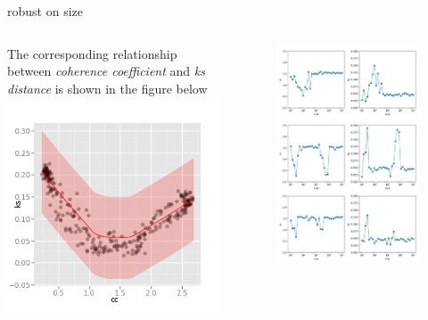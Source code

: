\documentclass{beamer}
\begin{document}
\begin{frame}{robust on size}
	\begin{columns}
		The corresponding relationship between \textit{coherence coefficient} and \textit{ks distance} is shown in the figure below
		\centering
		\includegraphics[width=0.85\linewidth]{fig/cc_vc_ks}
		\begin{figure}[htbp]
			\centering
			\includegraphics[scale=0.2]{fig/size_influence_total}

\end{figure}
\end{columns}
\end{frame}
\end{document}
